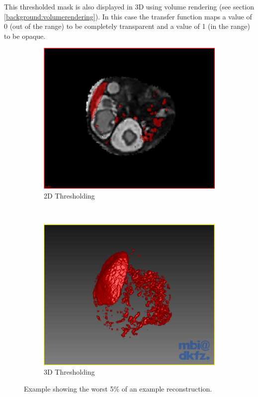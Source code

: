 This thresholded mask is also displayed in 3D using volume rendering (see section \ref{background:volumerendering}). In this case the transfer function maps a value of 0 (out of the range) to be completely transparent and a value of 1 (in the range) to be opaque.

\begin{figure}
  \centering
  \begin{subfigure}[b]{0.5\textwidth}
    \includegraphics[width=\textwidth]{images/thresholding_2d.png}
    \caption{2D Thresholding}
    \label{fig:thresholding2d}
  \end{subfigure}%
  ~ %
  \begin{subfigure}[b]{0.5\textwidth}
    \includegraphics[width=\textwidth]{images/thresholding_3d.png}
    \caption{3D Thresholding}
    \label{fig:thresholding3d}
  \end{subfigure}
  \caption{Example showing the worst 5$\%$ of an example reconstruction.}\label{fig:threshldingoverview}
\end{figure}


